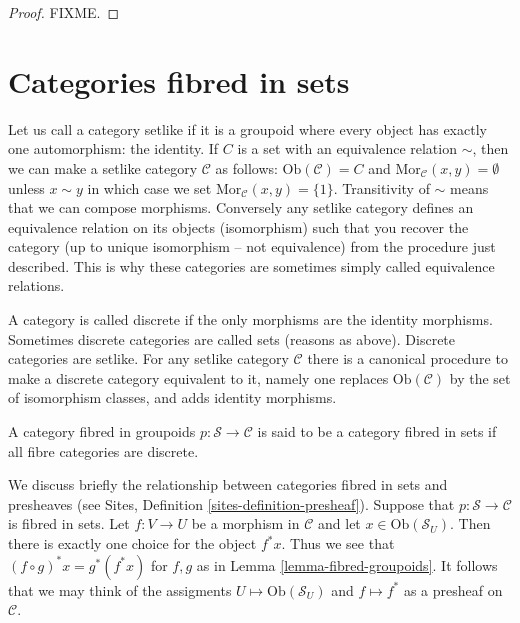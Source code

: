 \begin{proof} 
FIXME.
\end{proof}

\section{Categories fibred in sets}
\label{section-fibred-in-sets}

\noindent
Let us call a category setlike if it is a groupoid where every object
has exactly one automorphism: the identity. If $C$ is a set with an 
equivalence relation $\sim$, then we can make a setlike category
$\mathcal{C}$ as follows: $\text{Ob}(\mathcal{C}) = C$ and 
$\text{Mor}_\mathcal{C}(x,y) = \emptyset$ unless $x \sim y$ in which
case we set $\text{Mor}_\mathcal{C}(x,y) = \{1\}$. Transitivity of
$\sim$ means that we can compose morphisms. Conversely any setlike
category defines an equivalence relation on its objects (isomorphism)
such that you recover the category (up to unique isomorphism -- not
equivalence) from the procedure just described. This is why these categories
are sometimes simply called equivalence relations.

\medskip\noindent
A category is called discrete if the only morphisms are the identity 
morphisms. Sometimes discrete categories are called sets (reasons as above).
Discrete categories are setlike. For any setlike category $\mathcal{C}$
there is a canonical procedure to make a discrete category equivalent to it,
namely one replaces $\text{Ob}(\mathcal{C})$ by the set of isomorphism
classes, and adds identity morphisms.

\begin{definition}
\label{definition-category-fibred-sets}
A category fibred in groupoids $p : \mathcal{S} \to \mathcal{C}$ is said
to be a category fibred in sets if all fibre categories are discrete.
\end{definition}

\noindent
We discuss briefly the relationship between categories fibred in sets
and presheaves (see Sites, Definition \ref{sites-definition-presheaf}).
Suppose that $p :
\mathcal{S} \to \mathcal{C}$ is fibred in sets. Let $f : V \to U$
be a morphism in $\mathcal{C}$ and let $x \in \text{Ob}(\mathcal{S}_U)$.
Then there is exactly one choice for the object $f^\ast x$. Thus we see that
$(f \circ g)^\ast x = g^\ast(f^\ast x)$ for $f,g$ as in Lemma
\ref{lemma-fibred-groupoids}. It follows that we may think of the
assigments $U \mapsto \text{Ob}(\mathcal{S}_U)$ and $f \mapsto f^\ast$
as a presheaf on $\mathcal{C}$.

